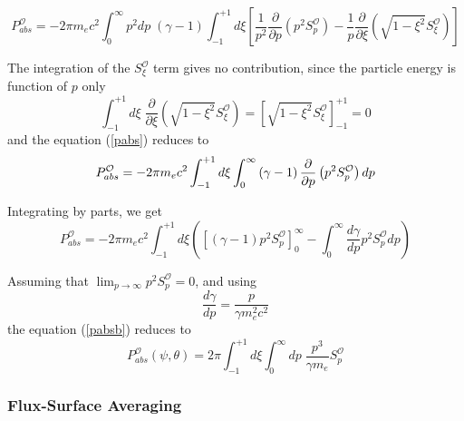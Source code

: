 \begin{equation}
P_{abs}^{\mathcal{O}}=-2\pi m_{e}c^{2}\int_{0}^{\infty}p^{2}dp\;\left(
\gamma-1\right) \int_{-1}^{+1}d\xi\left[ \frac{1}{p^{2}}\frac{\partial}{
\partial p}\left( p^{2}S_{p}^{\mathcal{O}}\right) -\frac{1}{p}\frac
{\partial}{\partial\xi}\left( \sqrt{1-\xi^{2}}S_{\xi}^{\mathcal{O}}\right)
\right]  \label{pabs}
\end{equation}

The integration of the $S_{\xi}^{\mathcal{O}}$ term gives no contribution,
since the particle energy is function of $p$ only
\begin{equation}
\int_{-1}^{+1}d\xi\;\frac{\partial}{\partial\xi}\left( \sqrt{1-\xi^{2}}
S_{\xi}^{\mathcal{O}}\right) =\left[ \sqrt{1-\xi^{2}}S_{\xi}^{\mathcal{O}
}\right] _{-1}^{+1}=0
\end{equation}
and the equation (\ref{pabs}) reduces to
\begin{equation}
P_{abs}^{\mathcal{O}}=-2\pi m_{e}c^{2}\int_{-1}^{+1}d\xi\int_{0}^{\infty
}\left( \gamma-1\right) \frac{\partial}{\partial p}\left( p^{2}S_{p}^{%
\mathcal{O}}\right) dp
\end{equation}

Integrating by parts, we get
\begin{equation}
P_{abs}^{\mathcal{O}}=-2\pi m_{e}c^{2}\int_{-1}^{+1}d\xi\left( \left[ \left(
\gamma-1\right) p^{2}S_{p}^{\mathcal{O}}\right]
_{0}^{\infty}-\int_{0}^{\infty}\frac{d\gamma}{dp}p^{2}S_{p}^{\mathcal{O}
}dp\right)  \label{pabsb}
\end{equation}

Assuming that $\lim_{p\rightarrow\infty}p^{2}S_{p}^{\mathcal{O}}=0$, and
using
\begin{equation}
\frac{d\gamma}{dp}=\frac{p}{\gamma m_{e}^{2}c^{2}}
\end{equation}
the equation (\ref{pabsb}) reduces to
\begin{equation}
P_{abs}^{\mathcal{O}}\left( \psi,\theta\right) =2\pi\int_{-1}^{+1}d\xi
\int_{0}^{\infty}dp\;\frac{p^{3}}{\gamma m_{e}}S_{p}^{\mathcal{O}}
\end{equation}

\subsubsection{Flux-Surface Averaging}

